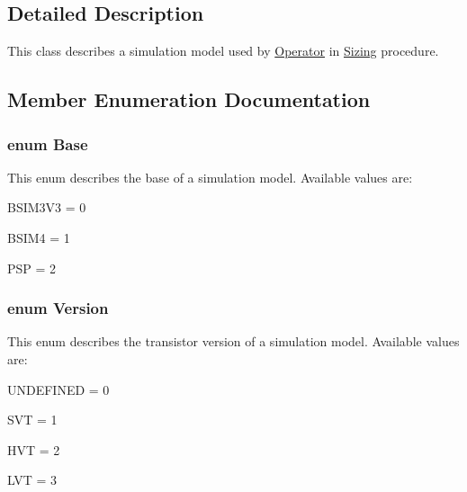 \subsection{Detailed Description}
This class describes a simulation model used by \hyperlink{class_open_chams_1_1_operator}{Operator} in \hyperlink{class_open_chams_1_1_sizing}{Sizing} procedure. 

\subsection{Member Enumeration Documentation}
\hypertarget{class_open_chams_1_1_simul_model_a450696a95d6cb29d7723838846948340}{
\subsubsection[{Base}]{\setlength{\rightskip}{0pt plus 5cm}enum {\bf Base}}}\label{class_open_chams_1_1_simul_model_a450696a95d6cb29d7723838846948340}
This enum describes the base of a simulation model. Available values are\-:
\begin{DoxyItemize}
\item B\-S\-I\-M3\-V3 = 0
\item B\-S\-I\-M4 = 1
\item P\-S\-P = 2 
\end{DoxyItemize}\hypertarget{class_open_chams_1_1_simul_model_a2256f5bba1c1c69a92b933aa501df470}{
\subsubsection[{Version}]{\setlength{\rightskip}{0pt plus 5cm}enum {\bf Version}}}\label{class_open_chams_1_1_simul_model_a2256f5bba1c1c69a92b933aa501df470}
This enum describes the transistor version of a simulation model. Available values are\-:
\begin{DoxyItemize}
\item U\-N\-D\-E\-F\-I\-N\-E\-D = 0
\item S\-V\-T = 1
\item H\-V\-T = 2
\item L\-V\-T = 3 
\end{DoxyItemize}

